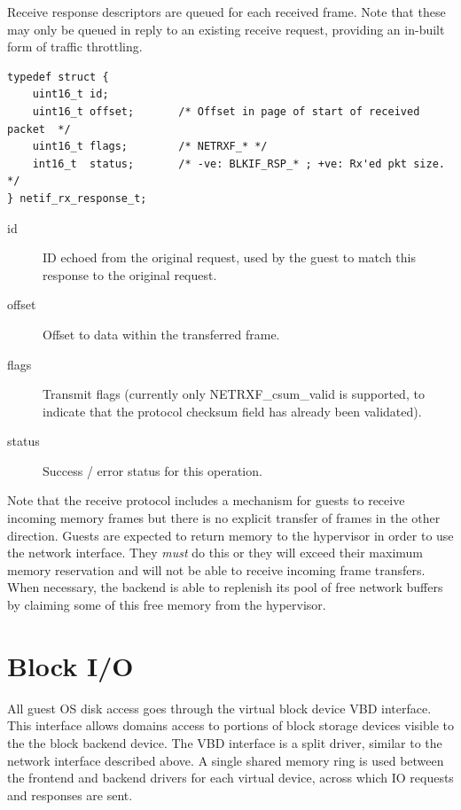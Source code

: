\documentclass[11pt,twoside,final,openright,a4paper]{report}
\begin{document}
Receive response descriptors are queued for each received frame.  Note
that these may only be queued in reply to an existing receive request,
providing an in-built form of traffic throttling.

\scriptsize
\begin{verbatim}
typedef struct {
    uint16_t id;
    uint16_t offset;       /* Offset in page of start of received packet  */
    uint16_t flags;        /* NETRXF_* */
    int16_t  status;       /* -ve: BLKIF_RSP_* ; +ve: Rx'ed pkt size. */
} netif_rx_response_t;
\end{verbatim}
\normalsize

\begin{description}
\item[id] ID echoed from the original request, used by the guest to
  match this response to the original request.
\item[offset] Offset to data within the transferred frame.
\item[flags] Transmit flags (currently only NETRXF\_csum\_valid is
  supported, to indicate that the protocol checksum field has already
  been validated).
\item[status] Success / error status for this operation.
\end{description}

Note that the receive protocol includes a mechanism for guests to
receive incoming memory frames but there is no explicit transfer of
frames in the other direction.  Guests are expected to return memory
to the hypervisor in order to use the network interface.  They {\em
must} do this or they will exceed their maximum memory reservation and
will not be able to receive incoming frame transfers.  When necessary,
the backend is able to replenish its pool of free network buffers by
claiming some of this free memory from the hypervisor.

\section{Block I/O}

All guest OS disk access goes through the virtual block device VBD
interface.  This interface allows domains access to portions of block
storage devices visible to the the block backend device.  The VBD
interface is a split driver, similar to the network interface
described above.  A single shared memory ring is used between the
frontend and backend drivers for each virtual device, across which
IO requests and responses are sent.
\end{document}
